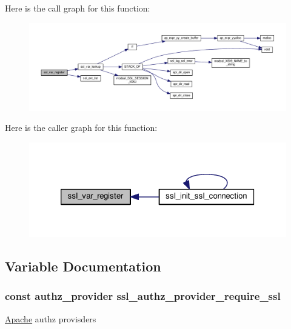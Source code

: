 Here is the call graph for this function\+:
\nopagebreak
\begin{figure}[H]
\begin{center}
\leavevmode
\includegraphics[width=350pt]{group__MOD__SSL__PRIVATE_gafbb3810aae5f5ad5d5d1e78977ff3888_cgraph}
\end{center}
\end{figure}




Here is the caller graph for this function\+:
\nopagebreak
\begin{figure}[H]
\begin{center}
\leavevmode
\includegraphics[width=320pt]{group__MOD__SSL__PRIVATE_gafbb3810aae5f5ad5d5d1e78977ff3888_icgraph}
\end{center}
\end{figure}




\subsection{Variable Documentation}
\subsubsection[{\texorpdfstring{ssl\+\_\+authz\+\_\+provider\+\_\+require\+\_\+ssl}{ssl_authz_provider_require_ssl}}]{\setlength{\rightskip}{0pt plus 5cm}const {\bf authz\+\_\+provider} ssl\+\_\+authz\+\_\+provider\+\_\+require\+\_\+ssl}\hypertarget{group__MOD__SSL__PRIVATE_ga056910a4fa97048c7118a76926dfddd4}{}\label{group__MOD__SSL__PRIVATE_ga056910a4fa97048c7118a76926dfddd4}
\hyperlink{namespaceApache}{Apache} authz provisders 
